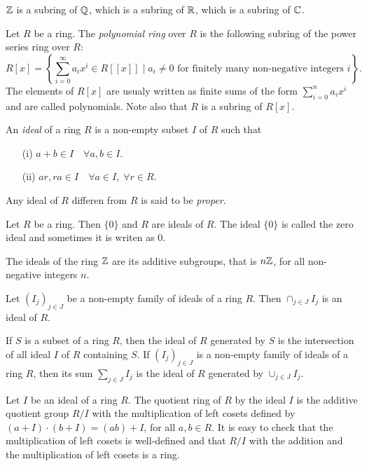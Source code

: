 \begin{example}
	$\mathbb{Z}$ is a subring of $\mathbb{Q}$, which is a subring of $\mathbb{R}$, which is a subring of $\mathbb{C}$.
	\end{example}

\begin{example}
	Let $R$ be a ring. The {\em polynomial ring} over $R$ is the following subring of the power series ring over $R$:
	$$R[x]=\left\{ \sum_{i=0}^{\infty}a_ix^{i}\in R[[x]] \mid a_i\neq 0 \mbox{ for finitely many non-negative integers } i \right\}.$$
	The elements of $R[x]$ are usualy written as finite sums of the form $\sum_{i=0}^na_ix^{i}$ and are called polynomials. Note also that $R$ is a subring of $R[x]$.
	\end{example}

An {\em ideal} of a ring $R$ is a non-empty subset $I$ of $R$ such that
\begin{itemize}
	\item[(i)] $a+b\in I\quad\forall a,b\in I$.
\item[(ii)] $ar,ra\in I\quad\forall a\in I,\;\forall r\in R$.
\end{itemize}
Any ideal of $R$ differen from $R$ is said to be {\em proper}.


\begin{example}
Let $R$ be a ring. Then $\{ 0\}$ and $R$ are ideals of $R$. The ideal $\{ 0\}$
is called the zero ideal and sometimes it is writen as $0$.
\end{example}

\begin{example}
The ideals of the ring $\mathbb{Z}$ are its additive subgroups, that is $n\mathbb{Z}$, for all non-negative integers $n$.
\end{example}


\begin{example} Let $(I_j)_{j\in J}$ be a non-empty family of ideals of a ring $R$. Then $\cap_{j\in J}I_j$ is an ideal of $R$.
\end{example}

If $S$ is a subset of a ring $R$, then the ideal of $R$ generated by $S$ 
is the intersection of all ideal $I$ of $R$ containing $S$. If
$(I_j)_{j\in J}$ is a non-empty family of ideals of a ring $R$, then its sum $\sum_{j\in J}I_j$ is the ideal of $R$ generated by
$\cup_{j\in  J}I_j$.

Let $I$ be an ideal of a ring $R$. The quotient ring of $R$ by the ideal $I$ is the additive quotient group
$R/I$ with the multiplication of left cosets defined by $(a+I)\cdot (b+I)=(ab)+I$, for all $a,b\in R$. It is easy to check that the multiplication of left cosets is well-defined and that $R/I$ with the addition and the multiplication of left cosets is a ring.



